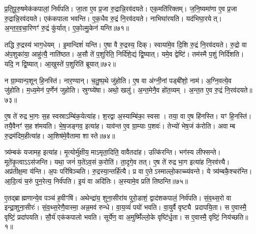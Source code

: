 प्र॒ति॒पू॒रु॒षमेक॑कपालां॒ निर्व॑पति।
जा॒ता ए॒व प्र॒जा रु॒द्रान्नि॒रव॑दयते।
एक॒मति॑रिक्तम्।
ज॒नि॒ष्यमा॑णा ए॒व प्र॒जा रु॒द्रान्नि॒रव॑दयते।
एक॑कपाला भवन्ति।
ए॒क॒धैव रु॒द्रं नि॒रव॑दयते।
नाभिघा॑रयति।
यद॑भिघा॒रयेत्।
अ॒न्त॒र॒व॒चा॒रिणꣳ॑ रु॒द्रं कु॑र्यात्।
ए॒को॒ल्मु॒केन॑ यन्ति॥७१॥

तद्धि रु॒द्रस्य॑ भाग॒धेयम्।
इ॒मान्दिशं॑ यन्ति।
ए॒षा वै रु॒द्रस्य॒ दिक्।
स्वाया॑मे॒व दि॒शि रु॒द्रं नि॒रव॑दयते।
रु॒द्रो वा अ॑प॒शुका॑या॒ आहु॑त्यै॒ नाति॑ष्ठत।
अ॒सौ ते॑ प॒शुरिति॒ निर्दि॑शे॒द्यं द्वि॒ष्यात्।
यमे॒व द्वेष्टि॑।
तम॑स्मै प॒शुं निर्दि॑शति।
यदि॒ न द्वि॒ष्यात्।
आ॒खुस्ते॑ प॒शुरिति॑ ब्रूयात्॥७२॥

न ग्रा॒म्यान्प॒शून् हि॒नस्ति॑।
नार॒ण्यान्।
च॒तु॒ष्प॒थे जु॑होति।
ए॒ष वा अ॑ग्नी॒नां पड्बी॑शो॒ नाम॑।
अ॒ग्नि॒वत्ये॒व जु॑होति।
म॒ध्य॒मेन॑ प॒र्णेन॑ जुहोति।
स्रुग्घ्ये॑षा।
अथो॒ खलु॑।
अ॒न्त॒मेनै॒व हो॑त॒व्यम्।
अ॒न्त॒त ए॒व रु॒द्रं नि॒रव॑दयते॥७३॥

ए॒ष ते॑ रुद्र भा॒गः स॒ह स्वस्रा\-ऽम्बि॑क॒येत्या॑ह।
श॒रद्वा अ॒स्याम्बि॑का॒ स्वसा।
तया॒ वा ए॒ष हि॑नस्ति।
यꣳ हि॒नस्ति॑।
तयै॒वैनꣳ॑ स॒ह श॑मयति।
भे॒ष॒जङ्गव॒ इत्या॑ह।
याव॑न्त ए॒व ग्रा॒म्याः प॒शवः॑।
तेभ्यो॑ भेष॒जं क॑रोति।
अवाम्ब रु॒द्रम॑दिम॒हीत्या॑ह।
आ॒शिष॑मे॒वैतामा शास्ते॥७४॥

त्र्य॑म्बकं यजामह॒ इत्या॑ह।
मृ॒त्योर्मु॑क्षीय॒ माऽमृता॒दिति॒ वावैतदा॑ह।
उत्कि॑रन्ति।
भग॑स्य लीफ्सन्ते।
मूते॑कृ॒त्वा\-ऽऽस॑जन्ति।
यथा॒ जनं॑ य॒ते॑\-ऽव॒सं क॒रोति॑।
ता॒दृगे॒व तत्।
ए॒ष ते॑ रुद्र भा॒ग इत्या॑ह नि॒रव॑त्त्यै।
अप्र॑तीक्ष॒मा य॑न्ति।
अ॒पः परि॑षिञ्चति।
रु॒द्रस्या॒न्तर्\mbox{}हि॑त्यै।
प्र वा ए॒ते\-ऽस्माल्लो॒काच्च्य॑वन्ते।
ये त्र्य॑म्बकै॒श्चर॑न्ति।
आ॒दि॒त्यं च॒रुं पुन॒रेत्य॒ निर्व॑पति।
इ॒यं वा अदि॑तिः।
अ॒स्यामे॒व प्रति॑ तिष्ठन्ति॥७५॥\anuvakamend[य॒न्ति॒ ब्रू॒या॒न्नि॒रव॑दयते शास्ते सिञ्चति॒ षट्च॑]




\clearpage
{}
\setcounter{anuvakam}{0}

ए॒तद्ब्राह्मणान्ये॒व पञ्च॑ ह॒वीꣳषि॑।
अथेन्द्रा॑य॒ शुना॒सीरा॑य पुरो॒डाशं॒ द्वाद॑शकपालं॒ निर्व॑पति।
सं॒व॒थ्स॒रो वा इन्द्रा॒शुना॒सीरः॑।
सं॒व॒थ्स॒रेणै॒वास्मा॒ अन्न॒मव॑ रुन्धे।
वा॒य॒व्यं॑ पयो॑ भवति।
वा॒युर्वै वृष्ट्यै प्रदापयि॒ता।
स ए॒वास्मै॒ वृष्टिं॒ प्रदा॑पयति।
सौ॒र्य॑ एक॑कपालो भवति।
सूर्ये॑ण॒ वा अ॒मुष्मिँ॑ल्लो॒के वृष्टि॑र्धृ॒ता।
स ए॒वास्मै॒ वृष्टिं॒ निय॑च्छति॥१॥

